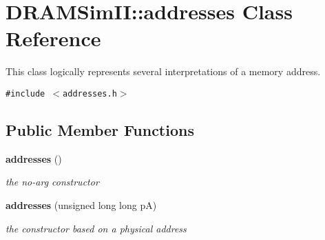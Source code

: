 \section{DRAMSimII::addresses Class Reference}
\label{class_d_r_a_m_sim_i_i_1_1addresses}
This class logically represents several interpretations of a memory address.  


{\tt \#include $<$addresses.h$>$}

\subsection*{Public Member Functions}
\begin{CompactItemize}
\item 
{\bf addresses} ()\label{class_d_r_a_m_sim_i_i_1_1addresses_534fafe152268349b34aca5cb2c7e900}

\begin{CompactList}\small\item\em the no-arg constructor \item\end{CompactList}\item 
{\bf addresses} (unsigned long long pA)\label{class_d_r_a_m_sim_i_i_1_1addresses_04df36739f6b778fdac024184f353e60}

\begin{CompactList}\small\item\em the constructor based on a physical address \item\end{CompactList}\end{CompactItemize}
